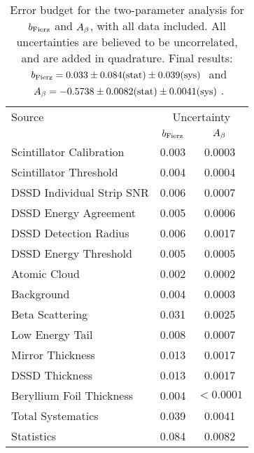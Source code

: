 



\begin{table}[h!!!!t]
	\begin{center}
	\begin{tabular}{ l  c  c  }
		\multicolumn{1}{l}{ Source} 		& \multicolumn{2}{c}{ \;\;\; \;\;\; Uncertainty \;\;\; \;\;\; }   
		\\
		\multicolumn{1}{l}{ } 				& \multicolumn{1}{c}{\;\; $b_{\mathrm{Fierz}}$}   & \multicolumn{1}{c}{$A_{\beta}$}   	
		\\  \hline
		Scintillator Calibration 			& 0.003								& 0.0003											
		\\
		Scintillator Threshold  			& 0.004 							& 0.0004 						
		\\
		DSSD Individual Strip SNR 			& 0.006								& 0.0007													
		\\
		DSSD Energy Agreement	  			& 0.005 							& 0.0006 						
		\\
		DSSD Detection Radius	  			& 0.006 							& 0.0017 						
		\\
		DSSD Energy Threshold	  			& 0.005 							& 0.0005 						
		\\
		Atomic Cloud			  			& 0.002 							& 0.0002 						
		\\
		Background				  			& 0.004 							& 0.0003 						
		\\
		Beta Scattering				  		& 0.031 							& 0.0025 						
		\\
		Low Energy Tail				  		& 0.008 							& 0.0007 						
		\\
		Mirror Thickness				  	& 0.013 							& 0.0017 						
		\\
		DSSD Thickness				 	 	& 0.013 							& 0.0017 						
		\\
		Beryllium Foil Thickness			& 0.004								& $\!\!\!\!\!\! < 0.0001$ 			
		\\  \hline
		\multicolumn{1}{l}{ Total Systematics} & \multicolumn{1}{c}{0.039}  & \multicolumn{1}{c}{0.0041}
		\\
		\multicolumn{1}{l}{ Statistics} 	   & \multicolumn{1}{c}{0.084}  & \multicolumn{1}{c}{0.0082}
	\end{tabular}
	\end{center}
	\caption[Error Budget]{Error budget for the two-parameter analysis for $b_{\mathrm{Fierz}}$ and $A_{\beta}$, with all data included.  All uncertainties are believed to be uncorrelated, and are added in quadrature.  Final results: 
	$\mbox{ $b_{\mathrm{Fierz}} = 0.033 \pm 0.084(\textrm{stat}) \pm 0.039(\textrm{sys})$ }$ and $\mbox{ $A_{\beta} = -0.5738 \pm 0.0082(\textrm{stat}) \pm 0.0041(\textrm{sys})$ }$. }
	\label{table:budget}
\end{table}




